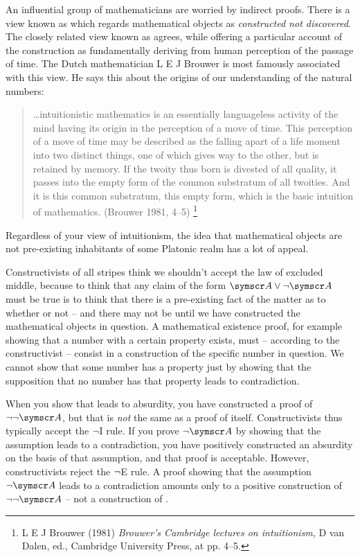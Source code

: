 An influential group of mathematicians are worried by indirect proofs. There is a view known as  which regards mathematical objects as  \emph{constructed not discovered}. The closely related view known as  agrees, while offering a particular account of the construction as fundamentally deriving from human perception of the passage of time. The Dutch mathematician L E J Brouwer is most famously associated with this view. He says this about the origins of our understanding of the natural numbers: \begin{quote}
…intuitionistic mathematics is an essentially languageless activity of the mind having its origin in the perception of a move of time. This perception of a move of time may be described as the falling apart of a life moment into two distinct things, one of which gives way to the other, but is retained by memory. If the twoity thus born is divested of all quality, it passes into the empty form of the common substratum of all twoities. And it is this common substratum, this empty form, which is the basic intuition of mathematics. (Brouwer 1981, 4–5)	\footnote{L E J Brouwer (1981) \emph{Brouwer’s Cambridge lectures on intuitionism}, D van Dalen, ed., Cambridge University Press, at pp. 4–5.}
\end{quote} 
Regardless of your view of intuitionism, the idea that mathematical objects are not pre-existing inhabitants of some Platonic realm has a lot of appeal. 

Constructivists of all stripes think we shouldn't accept the law of excluded middle, because to think that any claim of the form $\meta{A}\eor\enot\meta{A}$ must be true is to think that there is a pre-existing fact of the matter as to whether or not  – and there may not be until we have constructed the mathematical objects in question. A mathematical existence proof, for example showing that a number with a certain property exists, must – according to the constructivist – consist in a construction of the specific number in question. We cannot show that some number has a property just by showing that the supposition that no number has that property leads to contradiction. 

When you show that \enot{} leads to absurdity, you have constructed a proof of $\enot\enot\meta{A}$, but that is \emph{not} the same as a proof of  itself. Constructivists thus typically accept the $\neg$I  rule. If you prove $\enot\meta{A}$ by showing that the assumption  leads to a contradiction, you have positively constructed an absurdity on the basis of that assumption, and that proof is acceptable. However, constructivists reject the $\neg$E rule. A proof showing that the assumption $\enot\meta{A}$ leads to a contradiction amounts only to a positive construction of $\enot\enot\meta{A}$ – not a construction of . 

